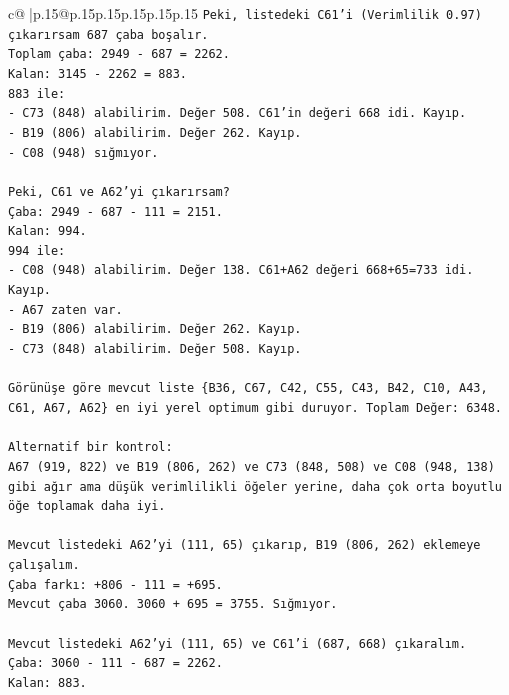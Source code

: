 \documentclass{article}
\begin{document}
{\begin{supertabular}{c@{$\;$}|p{.15\linewidth}@{}p{.15\linewidth}p{.15\linewidth}p{.15\linewidth}p{.15\linewidth}p{.15\linewidth}}
{{{\texttt{Peki, listedeki C61'i (Verimlilik 0.97) çıkarırsam 687 çaba boşalır.} \\
\texttt{Toplam çaba: 2949 {-} 687 = 2262.} \\
\texttt{Kalan: 3145 {-} 2262 = 883.} \\
\texttt{883 ile:} \\
\texttt{{-} C73 (848) alabilirim. Değer 508. C61'in değeri 668 idi. Kayıp.} \\
\texttt{{-} B19 (806) alabilirim. Değer 262. Kayıp.} \\
\texttt{{-} C08 (948) sığmıyor.} \\
\\ 
\texttt{Peki, C61 ve A62'yi çıkarırsam?} \\
\texttt{Çaba: 2949 {-} 687 {-} 111 = 2151.} \\
\texttt{Kalan: 994.} \\
\texttt{994 ile:} \\
\texttt{{-} C08 (948) alabilirim. Değer 138. C61+A62 değeri 668+65=733 idi. Kayıp.} \\
\texttt{{-} A67 zaten var.} \\
\texttt{{-} B19 (806) alabilirim. Değer 262. Kayıp.} \\
\texttt{{-} C73 (848) alabilirim. Değer 508. Kayıp.} \\
\\ 
\texttt{Görünüşe göre mevcut liste \{B36, C67, C42, C55, C43, B42, C10, A43, C61, A67, A62\} en iyi yerel optimum gibi duruyor. Toplam Değer: 6348.} \\
\\ 
\texttt{Alternatif bir kontrol:} \\
\texttt{A67 (919, 822) ve B19 (806, 262) ve C73 (848, 508) ve C08 (948, 138) gibi ağır ama düşük verimlilikli öğeler yerine, daha çok orta boyutlu öğe toplamak daha iyi.} \\
\\ 
\texttt{Mevcut listedeki A62'yi (111, 65) çıkarıp, B19 (806, 262) eklemeye çalışalım.} \\
\texttt{Çaba farkı: +806 {-} 111 = +695.} \\
\texttt{Mevcut çaba 3060. 3060 + 695 = 3755. Sığmıyor.} \\
\\ 
\texttt{Mevcut listedeki A62'yi (111, 65) ve C61'i (687, 668) çıkaralım.} \\
\texttt{Çaba: 3060 {-} 111 {-} 687 = 2262.} \\
\texttt{Kalan: 883.} \\
}}}
\end{supertabular}}
\end{document}

